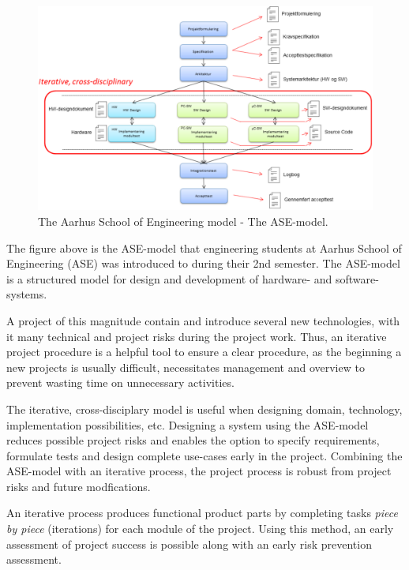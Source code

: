 \begin{figure}[H]
\centering
\includegraphics[scale=0.4]{./pictures/ASEmodel.png}
\caption{The Aarhus School of Engineering model - The ASE-model.}
\label{fig:ASEmodel.png}
\end{figure}

The figure above is the ASE-model that engineering students at Aarhus School of Engineering (ASE) was introduced to during their 2nd semester. The ASE-model is a structured model for design and development of hardware- and software-systems. \newline

A project of this magnitude contain and introduce several new technologies, with it many technical and project risks during the project work. Thus, an iterative project procedure is a helpful tool to ensure a clear procedure, as the beginning a new projects is usually difficult, necessitates management and overview to prevent wasting time on unnecessary activities. \newline

The iterative, cross-disciplary model is useful when designing domain, technology, implementation possibilities, etc. Designing a system using the ASE-model reduces possible project risks and enables the option to specify requirements, formulate tests and design complete use-cases early in the project. Combining the ASE-model with an iterative process, the project process is robust from project risks and future modfications. \newline

An iterative process produces functional product parts by completing tasks \textit{piece by piece} (iterations) for each module of the project. Using this method, an early assessment of project success is possible along with an early risk prevention assessment. \newline

